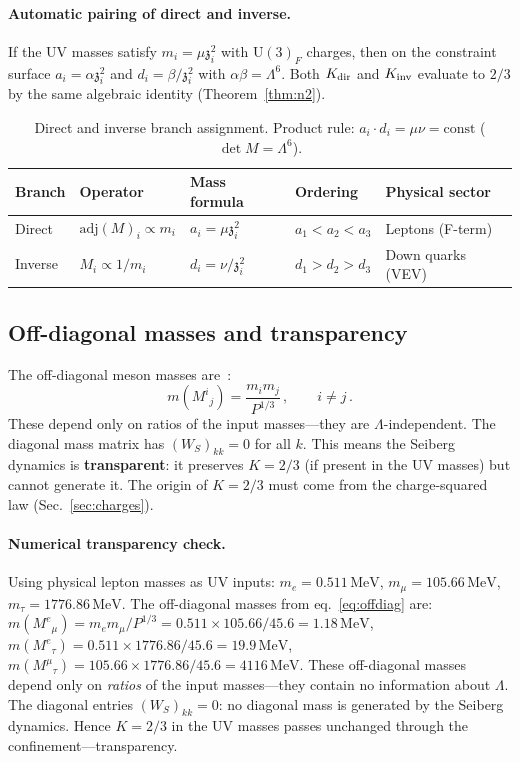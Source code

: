 \documentclass[12pt,a4paper]{article}
\newcommand{\UU}{\mathrm{U}}
\newcommand{\adj}{\mathrm{adj}}
\newcommand{\MeV}{\,\mathrm{MeV}}
\newcommand{\zch}{\mathfrak{z}}
\begin{document}
\paragraph{Automatic pairing of direct and inverse.}
If the UV masses satisfy $m_i = \mu\zch_i^2$ with $\UU(3)_F$
charges, then on the constraint surface
$a_i = \alpha\zch_i^2$ and $d_i = \beta/\zch_i^2$ with
$\alpha\beta = \Lambda^6$.
Both $K_{\rm dir}$ and $K_{\rm inv}$ evaluate to $2/3$ by
the same algebraic identity (Theorem~\ref{thm:n2}).

\begin{table}[ht]
\centering\small
\caption{Direct and inverse branch assignment.
  Product rule: $a_i \cdot d_i = \mu\nu = \text{const}$
  ($\det M = \Lambda^6$).}
\label{tab:branches}
\begin{tabular}{lllll}
\hline
Branch & Operator & Mass formula & Ordering & Physical sector \\
\hline
Direct & $\adj(M)_i \propto m_i$ & $a_i = \mu\zch_i^2$ & $a_1 < a_2 < a_3$ & Leptons (F-term) \\
Inverse & $M_i \propto 1/m_i$ & $d_i = \nu/\zch_i^2$ & $d_1 > d_2 > d_3$ & Down quarks (VEV) \\
\hline
\end{tabular}
\end{table}


\subsection{Off-diagonal masses and transparency}

The off-diagonal meson masses
are~\cite{CsakiSchmaltzSkiba:1997}:
\begin{equation}
  m(M^i{}_j) = \frac{m_i m_j}{P^{1/3}}\,,
  \qquad i \neq j\,.
  \label{eq:offdiag}
\end{equation}
These depend only on ratios of the input masses---they are
$\Lambda$-independent.
The diagonal mass matrix has $(W_S)_{kk} = 0$ for all $k$.
This means the Seiberg dynamics is \textbf{transparent}: it
preserves $K = 2/3$ (if present in the UV masses) but cannot
generate it.
The origin of $K = 2/3$ must come from the charge-squared law
(Sec.~\ref{sec:charges}).

\paragraph{Numerical transparency check.}
Using physical lepton masses as UV inputs:
$m_e = 0.511\MeV$, $m_\mu = 105.66\MeV$, $m_\tau = 1776.86\MeV$.
The off-diagonal masses from eq.~\eqref{eq:offdiag} are:
$m(M^e{}_\mu) = m_e m_\mu / P^{1/3}
= 0.511 \times 105.66 / 45.6 = 1.18\MeV$,
$m(M^e{}_\tau) = 0.511 \times 1776.86 / 45.6 = 19.9\MeV$,
$m(M^\mu{}_\tau) = 105.66 \times 1776.86 / 45.6 = 4116\MeV$.
These off-diagonal masses depend only on \emph{ratios} of the
input masses---they contain no information about $\Lambda$.
The diagonal entries $(W_S)_{kk} = 0$: no diagonal mass is
generated by the Seiberg dynamics.
Hence $K = 2/3$ in the UV masses passes unchanged through
the confinement---transparency.
\end{document}
